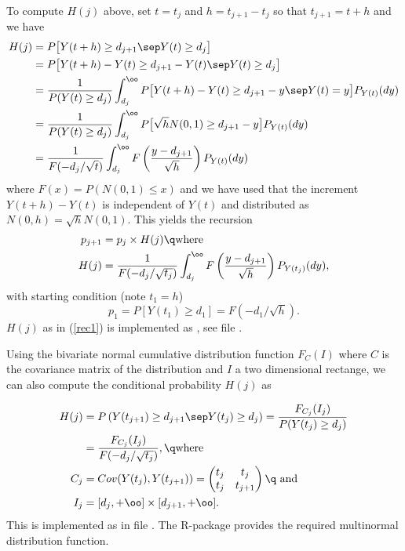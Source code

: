 To compute $H(j)$ above, set $t=t_j$ and $h=t_{j+1}-t_j$ so that
$t_{j+1}=t+h$ and we have
%
\begin{align*}
H(j) &=
P\big[Y(t+h)\geq d_{j+1}\sep Y(t)\geq d_j\big] \\&=
P\big[Y(t+h)-Y(t)\geq d_{j+1}-Y(t)\sep Y(t)\geq d_j\big] 
\\&=
\frac{1}{P(Y(t)\geq d_j)}
\int_{d_j}^\oo P\big[Y(t+h)-Y(t)\geq d_{j+1}-y\sep Y(t)=y\big]P_{Y(t)}(dy) 
\\&=
\frac{1}{P(Y(t)\geq d_j)}
\int_{d_j}^\oo P\big[\sqrt hN(0,1)\geq d_{j+1}-y\big]P_{Y(t)}(dy) 
\\&=
\frac{1}{F(-d_j/\sqrt{t})}
\int_{d_j}^\oo F\left(\frac{y-d_{j+1}}{\sqrt h}\right)P_{Y(t)}(dy)
\end{align*}
%
where $F(x)=P(N(0,1)\leq x)$ and we have used that the increment $Y(t+h)-Y(t)$ 
is independent of $Y(t)$ and distributed as $N(0,h)=\sqrt h N(0,1)$.
This yields the recursion
%
\begin{align}
\label{rec0}
p_{j+1} &= p_j\times H(j)\q\text{where}\\\label{rec1}
H(j) &= \frac{1}{F(-d_j/\sqrt{t_j})}
\int_{d_j}^\oo F\left(\frac{y-d_{j+1}}{\sqrt h}\right)P_{Y(t_j)}(dy),
\end{align}
%
with starting condition (note $t_1=h$)
%
\begin{equation}
\label{rec2}
p_1=P[Y(t_1)\geq d_1]=F(-d_1/\sqrt h).
\end{equation}
%
$H(j)$ as in (\ref{rec1}) is implemented as , see file
.

Using the bivariate normal cumulative distribution function $F_C(I)$
where $C$ is the covariance matrix of the distribution and $I$ a two dimensional 
rectange, we can also compute the conditional probability $H(j)$ as

%
\begin{align} 
\notag 
H(j) &=
P\left(Y(t_{j+1})\geq d_{j+1}\sep Y(t_j)\geq d_j\right)=
\frac{F_{C_j}(I_j)}{P(Y(t_j)\geq d_j)}
\\\label{Hj1}&=
\frac{F_{C_j}(I_j)}{F(-d_j/\sqrt{t_j})},
\q\text{where}\\\notag
C_j&=Cov(Y(t_j),Y(t_{j+1}))=
\begin{pmatrix}
t_j & t_j\\
t_j & t_{j+1}
\end{pmatrix}
\q\text{ and }\\\notag
I_j &= [d_j,+\oo]\times[d_{j+1},+\oo].
\end{align}
%
This is implemented as  in file .
The R-package  provides the required multinormal distribution
function.


